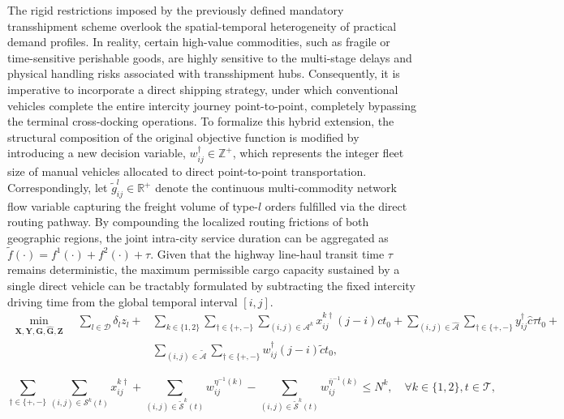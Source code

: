 \documentclass[10pt, reqno]{amsart}
\begin{document}
The rigid restrictions imposed by the previously defined mandatory transshipment scheme overlook the spatial-temporal heterogeneity of practical demand profiles. In reality, certain high-value commodities, such as fragile or time-sensitive perishable goods, are highly sensitive to the multi-stage delays and physical handling risks associated with transshipment hubs. Consequently, it is imperative to incorporate a direct shipping strategy, under which conventional vehicles complete the entire intercity journey point-to-point, completely bypassing the terminal cross-docking operations. To formalize this hybrid extension, the structural composition of the original objective function is modified by introducing a new decision variable, $w^{\dagger}_{ij}\in \mathbb{Z}^+$, which represents the integer fleet size of manual vehicles allocated to direct point-to-point transportation. Correspondingly, let $\tilde{g}^l_{ij} \in \mathbb{R}^+$ denote the continuous multi-commodity network flow variable capturing the freight volume of type-$l$ orders fulfilled via the direct routing pathway. By compounding the localized routing frictions of both geographic regions, the joint intra-city service duration can be aggregated as $\tilde{f}(\cdot)=f^1(\cdot)+f^2(\cdot)+\tau$. Given that the highway line-haul transit time $\tau$ remains deterministic, the maximum permissible cargo capacity sustained by a single direct vehicle can be tractably formulated by subtracting the fixed intercity driving time from the global temporal interval $[i, j]$. 
\begin{equation}
\begin{split}
\min_{\mathbf{X}, \mathbf{Y}, \mathbf{G}, \hat{\mathbf{G}}, \mathbf{Z}} \quad \sum_{l \in \mathcal{D}} \delta_l z_l+ &\sum_{k \in \{1,2\}} \sum_{\dagger \in \{+,-\}} \sum_{(i,j) \in \mathcal{A}^{k}} x_{ij}^{k\dagger} (j-i) c t_0 + \sum_{(i,j) \in \hat{\mathcal{A}}} \sum_{\dagger \in \{+,-\}} y_{ij}^{\dagger} \hat{c} \tau t_0+
\\&\sum_{(i,j)\in\tilde{\mathcal{A}}}\sum_{\dagger\in\{+,-\}}w^{\dagger}_{ij}(j-i)\tilde{c}t_0,\label{m2:obj}
\end{split}
\end{equation}

\noindent {}
\begin{equation}
\sum_{\dagger \in \{+,-\}} \sum_{(i,j) \in \mathcal{S}^k(t)} x_{ij}^{k\dagger} +\sum_{(i,j)\in\tilde{\mathcal{S}}^k(t)}w^{\eta^{-1}(k)}_{ij}-\sum_{(i,j)\in\tilde{\mathcal{S}}^k(t)}w^{\bar{\eta}^{-1}(k)}_{ij}\le N^k, \quad \forall k \in \{1,2\}, t \in \mathcal{T},\label{m2:num man veh}
\end{equation}
\end{document}

